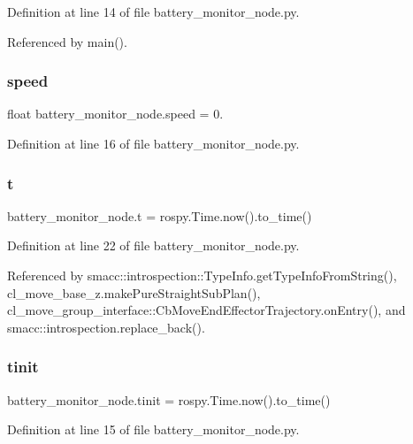 Definition at line 14 of file battery\+\_\+monitor\+\_\+node.\+py.



Referenced by main().

\mbox{\label{namespacebattery__monitor__node_a78ba7243610b635b1712c5af728edc13}} 
\subsubsection{\texorpdfstring{speed}{speed}}
{\footnotesize\ttfamily float battery\+\_\+monitor\+\_\+node.\+speed = 0.}



Definition at line 16 of file battery\+\_\+monitor\+\_\+node.\+py.

\mbox{\label{namespacebattery__monitor__node_a7a63d20d1ea461e280f4eb5b47f925cd}} 
\subsubsection{\texorpdfstring{t}{t}}
{\footnotesize\ttfamily battery\+\_\+monitor\+\_\+node.\+t = rospy.\+Time.\+now().to\+\_\+time()}



Definition at line 22 of file battery\+\_\+monitor\+\_\+node.\+py.



Referenced by smacc\+::introspection\+::\+Type\+Info.\+get\+Type\+Info\+From\+String(), cl\+\_\+move\+\_\+base\+\_\+z.\+make\+Pure\+Straight\+Sub\+Plan(), cl\+\_\+move\+\_\+group\+\_\+interface\+::\+Cb\+Move\+End\+Effector\+Trajectory.\+on\+Entry(), and smacc\+::introspection.\+replace\+\_\+back().

\mbox{\label{namespacebattery__monitor__node_adb6d4f12628aa05bce6384b0f89001e4}} 
\subsubsection{\texorpdfstring{tinit}{tinit}}
{\footnotesize\ttfamily battery\+\_\+monitor\+\_\+node.\+tinit = rospy.\+Time.\+now().to\+\_\+time()}



Definition at line 15 of file battery\+\_\+monitor\+\_\+node.\+py.

